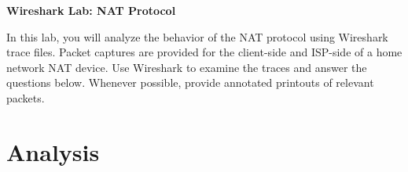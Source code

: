 \documentclass[12pt]{article}
\begin{document}
\begin{center}
    \Large \textbf{Wireshark Lab: NAT Protocol}
\end{center}

\vspace{1cm}

In this lab, you will analyze the behavior of the NAT protocol using Wireshark trace files. Packet captures are provided for the client-side and ISP-side of a home network NAT device. Use Wireshark to examine the traces and answer the questions below. Whenever possible, provide annotated printouts of relevant packets.

\section*{Analysis}
\end{document}

